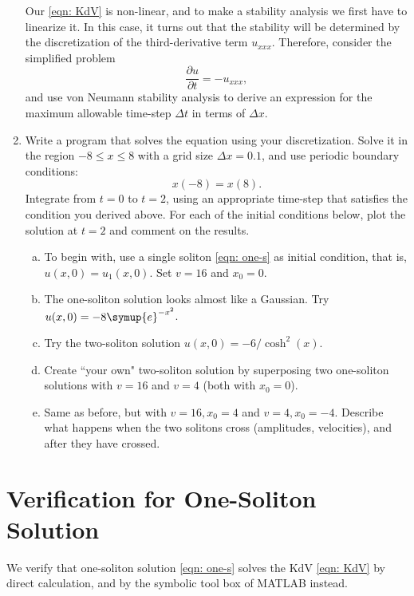 \documentclass{assignment}[2019/10/15]
\newcommand{\me}{\symup{e}}
\begin{document}
\begin{enumerate}[1)]
        Our \ref{eqn: KdV} is non-linear, and to make a stability analysis we first have to linearize it. In this case, it turns out that the stability will be determined by the discretization of the third-derivative term $u_{xxx}$. Therefore, consider the simplified problem
        \begin{equation}
            \frac{\partial u}{\partial t} = - u_{xxx},
        \end{equation}
        and use von Neumann stability analysis to derive an expression for the maximum allowable time-step $\Delta t$ in terms of $\Delta x$.
        \item Write a program that solves the equation using your discretization. Solve it in the region $-8\leq x\leq 8$ with a grid size $\Delta x=0.1$, and use periodic boundary conditions:
        \begin{equation}
            x(-8) = x(8).
        \end{equation}
        Integrate from $t=0$ to $t=2$, using an appropriate time-step that satisfies the condition you derived above. For each of the initial conditions below, plot the solution at $t=2$ and comment on the results.
        \begin{enumerate}[a.]
            \item To begin with, use a single soliton \ref{eqn: one-s} as initial condition, that is, $u(x, 0) = u_1(x, 0)$. Set $v=16$ and $x_0 = 0$.
            \item The one-soliton solution looks almost like a Gaussian. Try $u(x, 0)=-8\me^{-x^2}$.
            \item Try the two-soliton solution $u(x, 0) = -6/\cosh^2(x)$.
            \item Create ``your own" two-soliton solution by superposing two one-soliton solutions with $v=16$ and $v=4$ (both with $x_0=0$).
            \item Same as before, but with $v=16, x_0=4$ and $v=4, x_0=-4$. Describe what happens when the two solitons cross (amplitudes, velocities), and after they have crossed.
        \end{enumerate}
    \end{enumerate}

    \section{Verification for One-Soliton Solution}

    We verify that one-soliton solution \ref{eqn: one-s} solves the KdV \ref{eqn: KdV} by direct calculation, and by the symbolic tool box of MATLAB instead.
\end{document}
